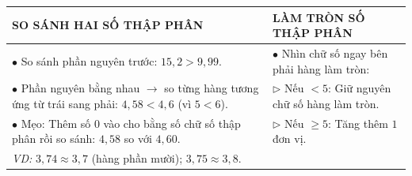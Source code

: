 \documentclass[14pt,a4paper,oneside]{extbook}
\begin{document}
\vspace{3mm}

\noindent
\begin{tcolorbox}[
  enhanced,
  title={\footnotesize\bfseries\color{white}\faBalanceScale\ 3. So sánh và Làm tròn số thập phân},
  colback=purple!2!white,
  colframe=purple!70!black,
  arc=2.5mm, boxrule=0.8pt, top=1.8mm, bottom=1.8mm, left=2.5mm, right=2.5mm
]
  \footnotesize
  \begin{tabular}{p{}|p{}}
    \textbf{SO SÁNH HAI SỐ THẬP PHÂN} & \textbf{LÀM TRÒN SỐ THẬP PHÂN} \\ \hline
    $\bullet$ So sánh phần nguyên trước: $15,2 > 9,99$. & $\bullet$ Nhìn chữ số ngay bên phải hàng làm tròn:\\
    $\bullet$ Phần nguyên bằng nhau $\rightarrow$ so từng hàng tương ứng từ trái sang phải: $4,58 < 4,6$ (vì $5 < 6$). & $\triangleright$ Nếu $< 5$: Giữ nguyên chữ số hàng làm tròn.\\
    $\bullet$ Mẹo: Thêm số $0$ vào cho bằng số chữ số thập phân rồi so sánh: $4,58$ so với $4,60$. & $\triangleright$ Nếu $\ge 5$: Tăng thêm $1$ đơn vị.\\
    \textit{VD:} $3,74 \approx 3,7$ (hàng phần mười); $3,75 \approx 3,8$.
  \end{tabular}
\end{tcolorbox}

\vspace{3mm}
\end{document}
